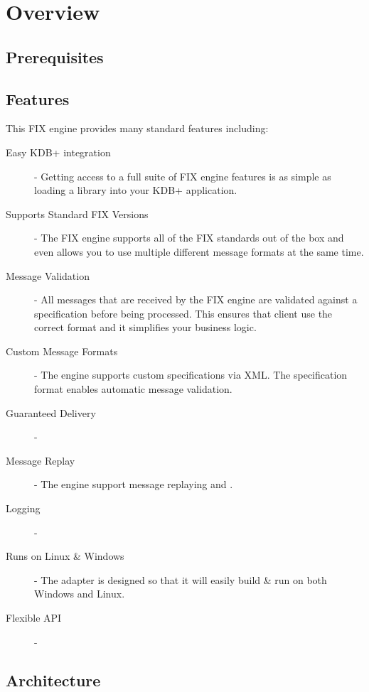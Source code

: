 \chapter{Overview}

\section{Prerequisites}
\section{Features}

This FIX engine provides many standard features including:

\begin{description}
	\item[Easy KDB+ integration] - Getting access to a full suite of FIX engine features is as simple as loading a library into your KDB+ application.
	\item[Supports Standard FIX Versions] - The FIX engine supports all of the FIX standards out of the box and even allows you to use multiple different message formats at the same time.
	\item[Message Validation] - All messages that are received by the FIX engine are validated against a specification before being processed. This ensures that client use the correct format and it simplifies your business logic.
	\item[Custom Message Formats] - The engine supports custom specifications via XML. The specification format enables automatic message validation.
	\item[Guaranteed Delivery] - 
	\item[Message Replay] - The engine support message replaying and .
	\item[Logging] - 
	\item[Runs on Linux \& Windows] - The adapter is designed so that it will easily build \& run on both Windows and Linux.
	\item[Flexible API] -
\end{description}

\section{Architecture}

